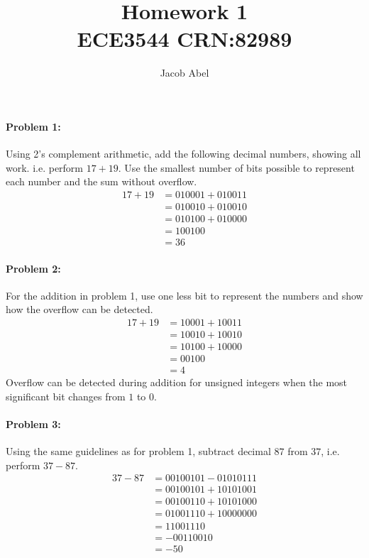 \documentclass[12pt,letterpaper,titlepage]{article}
\author{Jacob Abel}
\title{	Homework 1
	\\\large ECE3544 CRN:82989
}
\begin{document}
\maketitle
\begin{raggedright}
\begin{paracol}{2}
\paragraph{Problem 1: }
Using 2's complement arithmetic, add the following decimal numbers, showing all work. i.e. perform $17+19$. Use the smallest number of bits possible to represent each number and the sum without overflow. 
\begin{align*}
17+19 	&= 010001 + 010011
\\		&= 010010 + 010010
\\		&= 010100 + 010000
\\		&= 100100
\\		&= 36
\end{align*}
\paragraph{Problem 2: }
For the addition in problem 1, use one less bit to represent the numbers and show how the overflow can be detected.
\begin{align*}
17+19 	&= 10001 + 10011
\\		&= 10010 + 10010
\\		&= 10100 + 10000
\\		&= 00100
\\		&= 4
\end{align*}
Overflow can be detected during addition for unsigned integers when the most significant bit changes from $1$ to $0$.
\switchcolumn
\paragraph{Problem 3: }
Using the same guidelines as for problem 1, subtract decimal $87$ from $37$, i.e. perform $37-87$.
\begin{align*}
37-87 	&= 00100101 - 01010111
\\		&= 00100101 + 10101001
\\		&= 00100110 + 10101000
\\		&= 01001110 + 10000000
\\		&= 11001110
\\		&= -00110010
\\		&= -50
\end{align*}

\end{paracol}
\end{raggedright}
\end{document}
